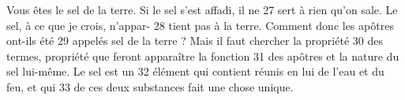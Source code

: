 Vous êtes le sel de la terre. Si le sel s'est affadi, il ne	 
27	 	sert à rien qu'on sale. Le sel, à ce que je crois, n'appar-	 
28	 	tient pas à la terre. Comment donc les apôtres ont-ils été	 
29	 	appelés sel de la terre ? Mais il faut chercher la propriété	 
30	 	des termes, propriété que feront apparaître la fonction	 
31	 	des apôtres et la nature du sel lui-même. Le sel est un	 
32	 	élément qui contient réunis en lui de l'eau et du feu, et qui	 
33	 	de ces deux substances fait une chose unique.